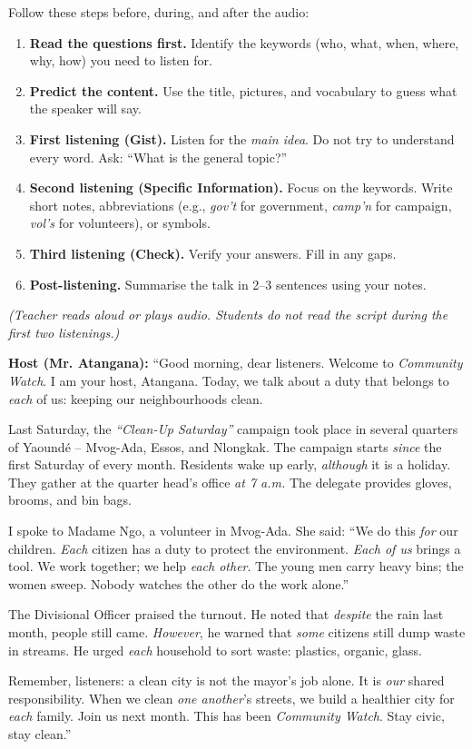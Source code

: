 \documentclass[11pt]{article}
\newcommand{\cle}[1]{{\popxbold\color{popdark}#1}}
\begin{document}
\begin{methode}
Follow these steps before, during, and after the audio:
\begin{enumerate}
\item \textbf{Read the questions first.} Identify the \cle{keywords} (who, what, when, where, why, how) you need to listen for.
\item \textbf{Predict the content.} Use the title, pictures, and vocabulary to guess what the speaker will say.
\item \textbf{First listening (Gist).} Listen for the \emph{main idea}. Do not try to understand every word. Ask: ``What is the general topic?''
\item \textbf{Second listening (Specific Information).} Focus on the keywords. Write short notes, \cle{abbreviations} (e.g., \emph{gov't} for government, \emph{camp'n} for campaign, \emph{vol's} for volunteers), or symbols.
\item \textbf{Third listening (Check).} Verify your answers. Fill in any gaps.
\item \textbf{Post-listening.} Summarise the talk in 2--3 sentences using your notes.
\end{enumerate}
\end{methode}

\begin{experience}
\textit{(Teacher reads aloud or plays audio. Students do not read the script during the first two listenings.)}

\textbf{Host (Mr. Atangana):} ``Good morning, dear listeners. Welcome to \emph{Community Watch}. I am your host, Atangana. Today, we talk about a duty that belongs to \emph{each} of us: keeping our neighbourhoods clean.

Last Saturday, the \emph{``Clean-Up Saturday''} campaign took place in several quarters of Yaoundé -- Mvog-Ada, Essos, and Nlongkak. The campaign starts \emph{since} the first Saturday of every month. Residents wake up early, \emph{although} it is a holiday. They gather at the quarter head's office \emph{at 7 a.m.} The delegate provides gloves, brooms, and bin bags.

I spoke to Madame Ngo, a volunteer in Mvog-Ada. She said: ``We do this \emph{for} our children. \emph{Each} citizen has a duty to protect the environment. \emph{Each of us} brings a tool. We work together; we help \emph{each other}. The young men carry heavy bins; the women sweep. Nobody watches the other do the work alone.''

The Divisional Officer praised the turnout. He noted that \emph{despite} the rain last month, people still came. \emph{However}, he warned that \emph{some} citizens still dump waste in streams. He urged \emph{each} household to sort waste: plastics, organic, glass.

Remember, listeners: a clean city is not the mayor's job alone. It is \emph{our} shared responsibility. When we clean \emph{one another}'s streets, we build a healthier city for \emph{each} family. Join us next month. This has been \emph{Community Watch}. Stay civic, stay clean.''
\end{experience}
\end{document}
